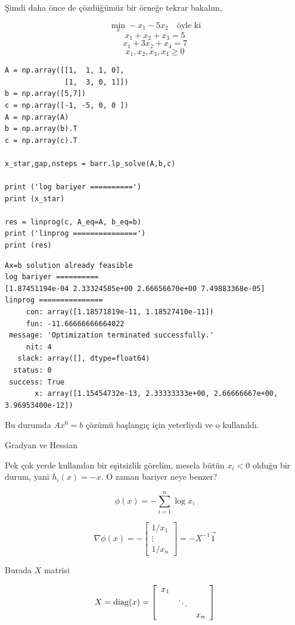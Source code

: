 \documentclass[12pt,fleqn]{article}\usepackage{../../common}
\begin{document}
Şimdi daha önce de çözdüğümüz bir örneğe tekrar bakalım,

$$
\min_x -x_1 - 5x_2 \quad \textrm{öyle ki}
$$
$$
x_1 + x_2 + x_3  = 5 
$$
$$
x_1 + 3 x_2 + x_4 = 7
$$
$$
x_1,x_2,x_3,x_4 \ge 0
$$

\begin{verbatim}
A = np.array([[1,  1, 1, 0],
              [1,  3, 0, 1]])
b = np.array([5,7])
c = np.array([-1, -5, 0, 0 ])
A = np.array(A)
b = np.array(b).T
c = np.array(c).T

x_star,gap,nsteps = barr.lp_solve(A,b,c)

print ('log bariyer ==========')
print (x_star)

res = linprog(c, A_eq=A, b_eq=b)
print ('linprog ===============')
print (res)
\end{verbatim}

\begin{verbatim}
Ax=b solution already feasible
log bariyer ==========
[1.87451194e-04 2.33324585e+00 2.66656670e+00 7.49883368e-05]
linprog ===============
     con: array([1.18571819e-11, 1.18527410e-11])
     fun: -11.66666666664022
 message: 'Optimization terminated successfully.'
     nit: 4
   slack: array([], dtype=float64)
  status: 0
 success: True
       x: array([1.15454732e-13, 2.33333333e+00, 2.66666667e+00, 3.96953400e-12])
\end{verbatim}

Bu durumda $Ax^0=b$ çözümü başlangıç için yeterliydi ve o kullanıldı.

Gradyan ve Hessian

Pek çok yerde kullanılan bir eşitsizlik görelim, mesela bütün $x_i < 0$
olduğu bir durum, yani $h_i(x) = -x$. O zaman bariyer neye benzer? 

$$
\phi(x) = - \sum_{i=1}^{n} \log x_i
$$

$$
\nabla \phi(x) = - \left[\begin{array}{c}
1/x_1  \\ 
\vdots \\
1/x_n
\end{array}\right] 
= - X^{-1} \vec{1}
$$

Burada $X$ matrisi 

$$
X = \operatorname{diag}(x) = 
\left[\begin{array}{ccc}
x_1 & & \\
    & \ddots & \\
    & & x_n
\end{array}\right]
$$
\end{document}
